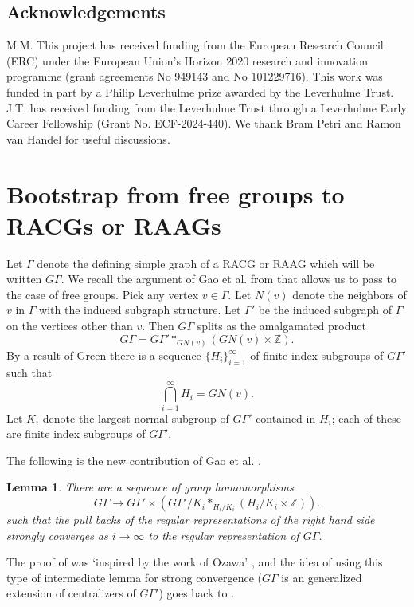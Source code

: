 \documentclass[12pt]{article}
\newtheorem{lemma}[theorem]{Lemma}
\newcommand{\Z}{\mathbb{Z}}
\newcommand{\1}{\mathds{1}}
\begin{document}
\subsection*{Acknowledgements}

M.M. This project has received
funding from the European Research Council (ERC) under the European
Union's Horizon 2020 research and innovation programme
(grant agreements No 949143 and No 101229716). This work
was funded in part by a Philip Leverhulme prize awarded by the Leverhulme Trust.
J.T. has received funding from the Leverhulme Trust through a Leverhulme Early
Career Fellowship (Grant No. ECF-2024-440). We thank Bram Petri and Ramon van Handel for useful discussions.


\section{Bootstrap from free groups to RACGs or RAAGs}
\label{sec: bootstrap}
Let $\Gamma$  denote the defining simple graph of a RACG or RAAG which will be written $G\Gamma$. 
We recall the argument of Gao et al. from \cite{gao2026newsourcepurelyfinite} that allows us to pass to the case of free groups.
Pick any  vertex $v\in \Gamma$. Let $N(v)$  denote the neighbors of $v$ in $\Gamma$ with the induced subgraph structure. Let $\Gamma'$ be the induced subgraph of $\Gamma$ on the vertices other than $v$. 
Then $G\Gamma$ splits as the amalgamated product 
\[
G\Gamma =   G\Gamma' \ast_{GN(v)} ( GN(v) \times \Z ).
\]
By a result of Green \cite[Thm. 5.3]{Green} there is a sequence $\{H_i\}^\infty_{i=1}$  of finite index subgroups of $G\Gamma'$ such that 
\[ \bigcap_{i=1}^\infty H_i = GN(v).\]
Let $K_i$ denote the largest normal subgroup of $G\Gamma'$ contained in $H_i$; each of these are finite index subgroups of $G\Gamma'$.

The following is the new contribution of Gao et al. \cite[Lemma 2.3]{gao2026newsourcepurelyfinite}.
\begin{lemma}\label{lem:Gao}
There are a sequence of group homomorphisms
\[
G\Gamma \to G\Gamma' \times \left( G\Gamma' /K_i \ast_{H_i/K_i}  ( H_i/K_i \times \Z ) \right).
\]
such that the pull backs of the regular representations of the right hand side strongly converges as $i\to\infty$ to the regular representation of $G\Gamma$.
\end{lemma}
The proof of \cite[Lemma 2.3]{gao2026newsourcepurelyfinite} was `inspired by the work of Ozawa' \cite{ozawa2026proximalityselflessnessgroupcalgebras}, and the idea of using this type of intermediate lemma for strong convergence ($G\Gamma$ is an generalized extension of centralizers of $G\Gamma'$) goes back to \cite{Lo.Ma2025}.
\end{document}
